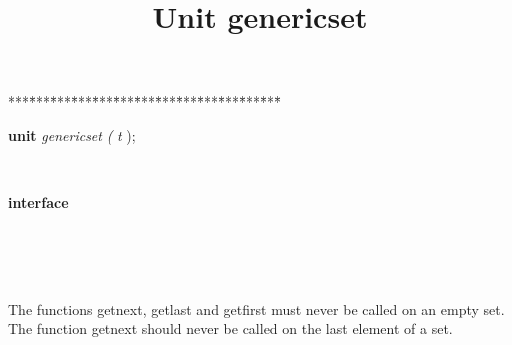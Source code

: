 \documentclass[10pt, a4paper]{article}
\title{Unit genericset}
\begin{document}
\maketitle

\tableofcontents
\pagebreak

\begin{tabbing}
***\=***\=***\=***\=***\=***\=***\=***\=***\=***\=***\=***\=***\=\kill
\parbox{14cm}{\textsf{\textbf{unit}  \textit{genericset}  \textit{(} \textit{t} );}}\\
\+\parbox{14cm}{\textsf{\textbf{interface} }}\\
\\
\\
\end{tabbing}
\textrm{The functions getnext, getlast and getfirst must never be called on an empty set. The function} 
\textrm{getnext should never be called on the last element of a set.} 
\end{document}
